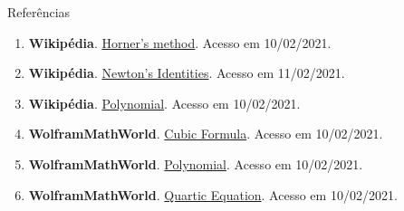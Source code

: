 \begin{frame}[fragile]{Referências}

    \begin{enumerate}
        \item \textbf{Wikipédia}. \href{https://en.wikipedia.org/wiki/Horner%27s_method}{Horner's method}. Acesso em 10/02/2021. 

        \item \textbf{Wikipédia}. \href{https://en.wikipedia.org/wiki/Newton%27s_identities}{Newton's Identities}. Acesso em 11/02/2021.

        \item \textbf{Wikipédia}. \href{https://en.wikipedia.org/wiki/Polynomial}{Polynomial}. Acesso em 10/02/2021.

        \item \textbf{WolframMathWorld}. \href{https://mathworld.wolfram.com/CubicFormula.html}{Cubic Formula}. Acesso em 10/02/2021.

        \item \textbf{WolframMathWorld}. \href{https://mathworld.wolfram.com/Polynomial.html}{Polynomial}. Acesso em 10/02/2021.

        \item \textbf{WolframMathWorld}. \href{https://mathworld.wolfram.com/QuarticEquation.html}{Quartic Equation}. Acesso em 10/02/2021.
    \end{enumerate}

\end{frame}

